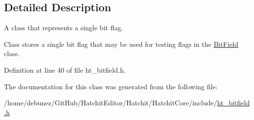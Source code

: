 \subsection{Detailed Description}
A class that represents a single bit flag. 

Class stores a single bit flag that may be used for testing flags in the \hyperlink{classHatchit_1_1Core_1_1BitField}{Bit\+Field} class. 

Definition at line 40 of file ht\+\_\+bitfield.\+h.



The documentation for this class was generated from the following file\+:\begin{DoxyCompactItemize}
\item 
/home/debunez/\+Git\+Hub/\+Hatchit\+Editor/\+Hatchit/\+Hatchit\+Core/include/\hyperlink{ht__bitfield_8h}{ht\+\_\+bitfield.\+h}\end{DoxyCompactItemize}
